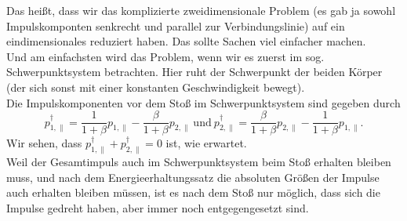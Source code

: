 \begin{Answer}[ref = col1]
	Das heißt, dass wir das komplizierte zweidimensionale Problem (es gab ja sowohl Impulskomponten senkrecht und parallel zur Verbindungslinie) auf ein eindimensionales reduziert haben. Das sollte Sachen viel einfacher machen. \\
	Und am einfachsten wird das Problem, wenn wir es zuerst im sog. Schwerpunktsystem betrachten. Hier ruht der Schwerpunkt der beiden Körper (der sich sonst mit einer konstanten Geschwindigkeit bewegt). \\
	Die Impulskomponenten vor dem Stoß im Schwerpunktsystem sind gegeben durch
	\begin{equation}\label{col1:psps}
		p^{\dagger}_{1,\parallel} = \frac{1}{1+\beta} p_{1,\parallel} - \frac{\beta}{1+\beta} p_{2,\parallel} ~\mathrm{und}~p^{\dagger}_{2,\parallel} = \frac{\beta}{1+\beta}p_{2,\parallel} -  \frac{1}{1+\beta} p_{1,\parallel}.
	\end{equation}
	Wir sehen, dass $p^{\dagger}_{1,\parallel} + p^{\dagger}_{2,\parallel} = 0$ ist, wie erwartet.\\
	Weil der Gesamtimpuls auch im Schwerpunktsystem beim Stoß erhalten bleiben muss, und nach dem Energieerhaltungssatz die absoluten Größen der Impulse auch erhalten bleiben müssen, ist es nach dem Stoß nur möglich, dass sich die Impulse gedreht haben, aber immer noch entgegengesetzt sind. 

	\end{Answer}